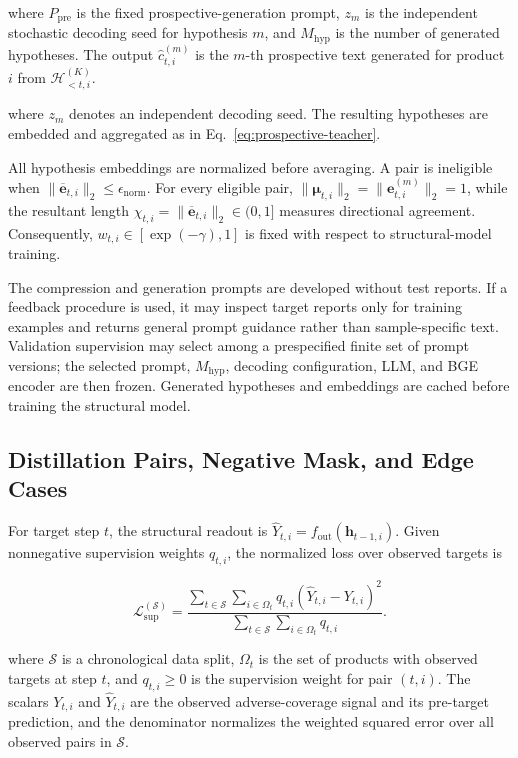 \documentclass[letterpaper]{article} %
\begin{document}
where \(P_{\mathrm{pre}}\) is the fixed prospective-generation prompt, \(z_m\) is the independent stochastic decoding seed for hypothesis \(m\), and \(M_{\mathrm{hyp}}\) is the number of generated hypotheses. The output \(\widehat c_{t,i}^{(m)}\) is the \(m\)-th prospective text generated for product \(i\) from \(\mathcal H_{<t,i}^{(K)}\).

where \(z_m\) denotes an independent decoding seed. The resulting hypotheses are embedded and aggregated as in Eq.~\ref{eq:prospective-teacher}.

All hypothesis embeddings are normalized before averaging. A pair is ineligible when \(\|\overline{\mathbf e}_{t,i}\|_2\leq\epsilon_{\mathrm{norm}}\). For every eligible pair, \(\|\boldsymbol\mu_{t,i}\|_2=\|\mathbf e_{t,i}^{(m)}\|_2=1\), while the resultant length \(\chi_{t,i}=\|\overline{\mathbf e}_{t,i}\|_2\in(0,1]\) measures directional agreement. Consequently, \(w_{t,i}\in[\exp(-\gamma),1]\) is fixed with respect to structural-model training.

The compression and generation prompts are developed without test reports. If a feedback procedure is used, it may inspect target reports only for training examples and returns general prompt guidance rather than sample-specific text. Validation supervision may select among a prespecified finite set of prompt versions; the selected prompt, \(M_{\mathrm{hyp}}\), decoding configuration, LLM, and BGE encoder are then frozen. Generated hypotheses and embeddings are cached before training the structural model.

\subsection{Distillation Pairs, Negative Mask, and Edge Cases}
\label{app:distillation-details}

For target step \(t\), the structural readout is \(\widehat Y_{t,i}=f_{\mathrm{out}}(\mathbf h_{t-1,i})\). Given nonnegative supervision weights \(q_{t,i}\), the normalized loss over observed targets is

\begin{equation}
\mathcal L_{\mathrm{sup}}^{(\mathcal S)}
=
\frac{\sum_{t\in\mathcal S}\sum_{i\in\Omega_t}
q_{t,i}(\widehat Y_{t,i}-Y_{t,i})^2}
{\sum_{t\in\mathcal S}\sum_{i\in\Omega_t}q_{t,i}}.
\label{eq:supervised-loss}
\end{equation}

where \(\mathcal S\) is a chronological data split, \(\Omega_t\) is the set of products with observed targets at step \(t\), and \(q_{t,i}\geq0\) is the supervision weight for pair \((t,i)\). The scalars \(Y_{t,i}\) and \(\widehat Y_{t,i}\) are the observed adverse-coverage signal and its pre-target prediction, and the denominator normalizes the weighted squared error over all observed pairs in \(\mathcal S\).
\end{document}
